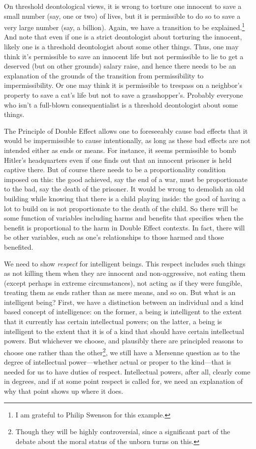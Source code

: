 On threshold deontological views, it is wrong to torture one innocent to save a small number (say, one or two) of lives,
but it is permissible to do so to save a very large number (say, a billion). Again, we have a transition to be 
explained.\footnote{I am grateful to Philip Swenson for this example.} And note that even if one is a strict deontologist
about torturing the innocent, likely one is a threshold deontologist about some other things. Thus, one may think it's
permissible to save an innocent life but not permissible to lie to get a deserved (but on other grounds) salary raise,
and hence there needs to be an explanation of the grounds of the transition from permissibility to impermissibility. Or
one may think it is permissible to trespass on a neighbor's property to save a cat's life but not to save a grasshopper's.
Probably everyone who isn't a full-blown consequentialist is a threshold deontologist about some things.

The Principle of Double Effect allows one to foreseeably cause bad effects that it would
be impermissible to cause intentionally, as long as these bad effects are not intended either as ends or means. For instance, it seems permissible to bomb Hitler's headquarters even
if one finds out that an innocent prisoner is held captive there. But of course there needs to be a proportionality
condition imposed on this: the good achieved, say the end of a war, must be proportionate to the bad, say the death of the prisoner. 
It would be wrong to demolish an old building while knowing that there is a child playing inside: the good of having a lot to build
on is not proportionate to the death of the child. So there will be some function of variables including harms and benefits that
specifies when the benefit is proportional to the harm in Double Effect contexts. In fact, there will be other variables, such as
one's relationships to those harmed and those benefited. 

We need to show \textit{respect} for intelligent beings. This respect includes such things as not killing them when they are
innocent and non-aggressive, not eating them (except perhaps in extreme circumstances), not acting as if they were fungible, treating them as ends rather than as
mere means, and so on. But what is an intelligent being? First, we have a distinction between an individual and a kind based
concept of intelligence: on the former, a being is intelligent to the extent that it currently has certain intellectual powers;
on the latter, a being is intelligent to the extent that it is of a kind that should have certain intellectual powers. But whichever we choose, and
plausibly there are principled reasons to choose one rather than the other\footnote{Though they will be highly controversial, since 
a significant part of the debate about the moral status of the unborn turns on this.}, 
we still have a Mersenne question as to the degree of intellectual power---whether actual or proper to the kind---that is 
needed for us to have duties of respect. Intellectual powers, after all, clearly come in degrees, and if at some point respect
is called for, we need an explanation of why that point shows up where it does.


